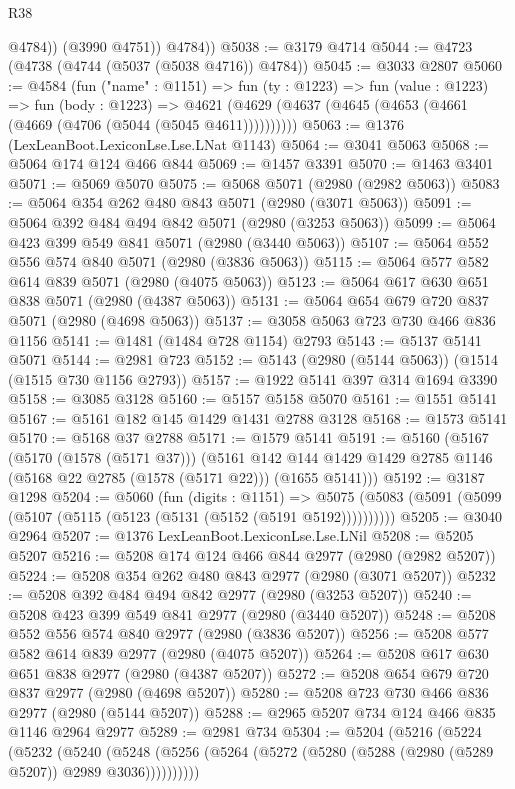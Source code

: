 \begin{lexlean}{R38}
\begin{coremodule}
              @4784))
          (@3990 @4751))
        @4784))
@5038 := @3179 @4714
@5044 := @4723 (@4738 (@4744 (@5037 (@5038 @4716)) @4784))
@5045 := @3033 @2807
@5060 := @4584
    (fun ("name" : @1151) =>
    fun (ty : @1223) =>
    fun (value : @1223) =>
    fun (body : @1223) =>
    @4621 (@4629 (@4637 (@4645 (@4653 (@4661 (@4669 (@4706 (@5044 (@5045 @4611))))))))))
@5063 := @1376 (LexLeanBoot.LexiconLse.Lse.LNat @1143)
@5064 := @3041 @5063
@5068 := @5064 @174 @124 @466 @844
@5069 := @1457 @3391
@5070 := @1463 @3401
@5071 := @5069 @5070
@5075 := @5068 @5071 (@2980 (@2982 @5063))
@5083 := @5064 @354 @262 @480 @843 @5071 (@2980 (@3071 @5063))
@5091 := @5064 @392 @484 @494 @842 @5071 (@2980 (@3253 @5063))
@5099 := @5064 @423 @399 @549 @841 @5071 (@2980 (@3440 @5063))
@5107 := @5064 @552 @556 @574 @840 @5071 (@2980 (@3836 @5063))
@5115 := @5064 @577 @582 @614 @839 @5071 (@2980 (@4075 @5063))
@5123 := @5064 @617 @630 @651 @838 @5071 (@2980 (@4387 @5063))
@5131 := @5064 @654 @679 @720 @837 @5071 (@2980 (@4698 @5063))
@5137 := @3058 @5063 @723 @730 @466 @836 @1156
@5141 := @1481 (@1484 @728 @1154) @2793
@5143 := @5137 @5141 @5071
@5144 := @2981 @723
@5152 := @5143 (@2980 (@5144 @5063)) (@1514 (@1515 @730 @1156 @2793))
@5157 := @1922 @5141 @397 @314 @1694 @3390
@5158 := @3085 @3128
@5160 := @5157 @5158 @5070
@5161 := @1551 @5141
@5167 := @5161 @182 @145 @1429 @1431 @2788 @3128
@5168 := @1573 @5141
@5170 := @5168 @37 @2788
@5171 := @1579 @5141
@5191 := @5160
    (@5167
      (@5170 (@1578 (@5171 @37)))
      (@5161 @142 @144 @1429 @1429 @2785 @1146 (@5168 @22 @2785 (@1578 (@5171 @22))) (@1655 @5141)))
@5192 := @3187 @1298
@5204 := @5060
    (fun (digits : @1151) =>
    @5075 (@5083 (@5091 (@5099 (@5107 (@5115 (@5123 (@5131 (@5152 (@5191 @5192))))))))))
@5205 := @3040 @2964
@5207 := @1376 LexLeanBoot.LexiconLse.Lse.LNil
@5208 := @5205 @5207
@5216 := @5208 @174 @124 @466 @844 @2977 (@2980 (@2982 @5207))
@5224 := @5208 @354 @262 @480 @843 @2977 (@2980 (@3071 @5207))
@5232 := @5208 @392 @484 @494 @842 @2977 (@2980 (@3253 @5207))
@5240 := @5208 @423 @399 @549 @841 @2977 (@2980 (@3440 @5207))
@5248 := @5208 @552 @556 @574 @840 @2977 (@2980 (@3836 @5207))
@5256 := @5208 @577 @582 @614 @839 @2977 (@2980 (@4075 @5207))
@5264 := @5208 @617 @630 @651 @838 @2977 (@2980 (@4387 @5207))
@5272 := @5208 @654 @679 @720 @837 @2977 (@2980 (@4698 @5207))
@5280 := @5208 @723 @730 @466 @836 @2977 (@2980 (@5144 @5207))
@5288 := @2965 @5207 @734 @124 @466 @835 @1146 @2964 @2977
@5289 := @2981 @734
@5304 := @5204
    (@5216
      (@5224
        (@5232
          (@5240
            (@5248 (@5256 (@5264 (@5272 (@5280 (@5288 (@2980 (@5289 @5207)) @2989 @3036))))))))))

\end{coremodule}
\end{lexlean}
